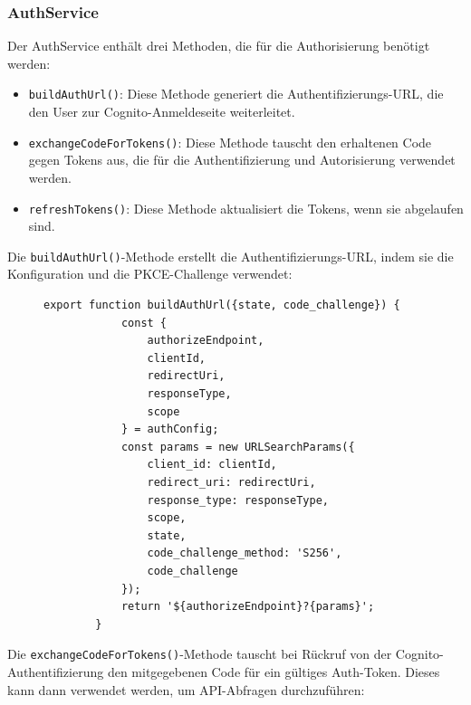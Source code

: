 \subsubsection{AuthService}
Der AuthService enthält drei Methoden, die für die Authorisierung benötigt werden:
\begin{itemize}
    \item \texttt{buildAuthUrl()}: Diese Methode generiert die Authentifizierungs-URL, die den User zur Cognito-Anmeldeseite weiterleitet.
    \item \texttt{exchangeCodeForTokens()}: Diese Methode tauscht den erhaltenen Code gegen Tokens aus, die für die Authentifizierung und Autorisierung verwendet werden.
    \item \texttt{refreshTokens()}: Diese Methode aktualisiert die Tokens, wenn sie abgelaufen sind.
\end{itemize}
Die \texttt{buildAuthUrl()}-Methode erstellt die Authentifizierungs-URL, indem sie die Konfiguration und die PKCE-Challenge verwendet:
\begin{figure}[H]
    \begin{lstlisting}[caption=Build-Auth Methode, label=list:buildAuth]
        export function buildAuthUrl({state, code_challenge}) {
            const {
                authorizeEndpoint,
                clientId,
                redirectUri,
                responseType,
                scope
            } = authConfig;
            const params = new URLSearchParams({
                client_id: clientId,
                redirect_uri: redirectUri,
                response_type: responseType,
                scope,
                state,
                code_challenge_method: 'S256',
                code_challenge
            });
            return '${authorizeEndpoint}?{params}';
        }
    \end{lstlisting}
\end{figure}
Die \texttt{exchangeCodeForTokens()}-Methode tauscht bei Rückruf von der Cognito-Authentifizierung den mitgegebenen Code für ein gültiges
Auth-Token. Dieses kann dann verwendet werden, um API-Abfragen durchzuführen:

